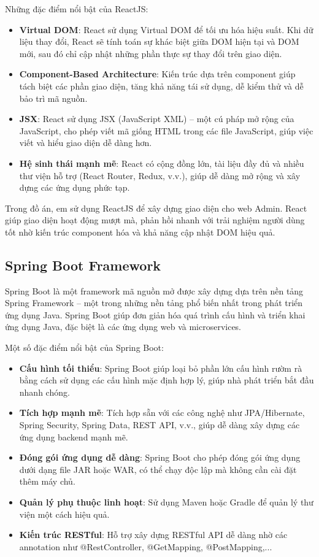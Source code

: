\documentclass[../DoAn.tex]{subfiles}
\begin{document}
Những đặc điểm nổi bật của ReactJS:
\begin{itemize}
    \item \textbf{Virtual DOM}: React sử dụng Virtual DOM để tối ưu hóa hiệu suất. Khi dữ liệu thay đổi, React sẽ tính toán sự khác biệt giữa DOM hiện tại và DOM mới, sau đó chỉ cập nhật những phần thực sự thay đổi trên giao diện.
    \item \textbf{Component-Based Architecture}: Kiến trúc dựa trên component giúp tách biệt các phần giao diện, tăng khả năng tái sử dụng, dễ kiểm thử và dễ bảo trì mã nguồn.
    \item \textbf{JSX}: React sử dụng JSX (JavaScript XML) – một cú pháp mở rộng của JavaScript, cho phép viết mã giống HTML trong các file JavaScript, giúp việc viết và hiểu giao diện dễ dàng hơn.
    \item \textbf{Hệ sinh thái mạnh mẽ}: React có cộng đồng lớn, tài liệu đầy đủ và nhiều thư viện hỗ trợ (React Router, Redux, v.v.), giúp dễ dàng mở rộng và xây dựng các ứng dụng phức tạp.
\end{itemize}

Trong đồ án, em sử dụng ReactJS để xây dựng giao diện cho web Admin. React giúp giao diện hoạt động mượt mà, phản hồi nhanh với trải nghiệm người dùng tốt nhờ kiến trúc component hóa và khả năng cập nhật DOM hiệu quả.

\subsection{Spring Boot Framework\cite{SpringBoot}}
Spring Boot là một framework mã nguồn mở được xây dựng dựa trên nền tảng Spring Framework – một trong những nền tảng phổ biến nhất trong phát triển ứng dụng Java. Spring Boot giúp đơn giản hóa quá trình cấu hình và triển khai ứng dụng Java, đặc biệt là các ứng dụng web và microservices.

Một số đặc điểm nổi bật của Spring Boot:
\begin{itemize}
    \item \textbf{Cấu hình tối thiểu}: Spring Boot giúp loại bỏ phần lớn cấu hình rườm rà bằng cách sử dụng các cấu hình mặc định hợp lý, giúp nhà phát triển bắt đầu nhanh chóng.
    \item \textbf{Tích hợp mạnh mẽ}: Tích hợp sẵn với các công nghệ như JPA/Hibernate, Spring Security, Spring Data, REST API, v.v., giúp dễ dàng xây dựng các ứng dụng backend mạnh mẽ.
    \item \textbf{Đóng gói ứng dụng dễ dàng}: Spring Boot cho phép đóng gói ứng dụng dưới dạng file JAR hoặc WAR, có thể chạy độc lập mà không cần cài đặt thêm máy chủ.
    \item \textbf{Quản lý phụ thuộc linh hoạt}: Sử dụng Maven hoặc Gradle để quản lý thư viện một cách hiệu quả.
    \item \textbf{Kiến trúc RESTful}: Hỗ trợ xây dựng RESTful API dễ dàng nhờ các annotation như @RestController, @GetMapping, @PostMapping,...
\end{itemize}
\end{document}
